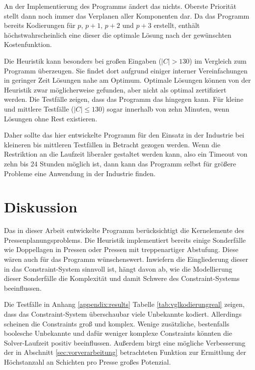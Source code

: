 An der Implementierung des Programms ändert das nichts.
Oberste Priorität stellt dann noch immer das Verplanen aller Komponenten dar.
Da das Programm bereits Kodierungen für $p$, $p+1$, $p+2$ und $p+3$ erstellt, enthält höchstwahrscheinlich eine dieser die optimale Lösung nach der gewünschten Kostenfunktion.

Die Heuristik kann besonders bei großen Eingaben ($\lvert C \rvert > 130$) im Vergleich zum Programm überzeugen.
Sie findet dort aufgrund einiger interner Vereinfachungen in geringer Zeit Lösungen nahe am Optimum.
Optimale Lösungen können von der Heuristik zwar möglicherweise gefunden, aber nicht als optimal zertifiziert werden.
Die Testfälle zeigen, dass das Programm das hingegen kann.
Für kleine und mittlere Testfälle ($\lvert C \rvert \leq 130$) sogar innerhalb von zehn Minuten, wenn Lösungen ohne Rest existieren.

Daher sollte das hier entwickelte Programm für den Einsatz in der Industrie bei kleineren bis mittleren Testfällen in Betracht gezogen werden.
Wenn die Restriktion an die Laufzeit liberaler gestaltet werden kann, also ein Timeout von zehn bis 24 Stunden möglich ist, dann kann das Programm selbst für
größere Probleme eine Anwendung in der Industrie finden.

\section{Diskussion}
Das in dieser Arbeit entwickelte Programm berücksichtigt die Kernelemente des Pressenplanungsproblems.
Die Heuristik implementiert bereits einige Sonderfälle wie Doppellagen in Pressen oder Pressen mit treppenartiger Abstufung.
Diese wären auch für das Programm wünschenswert.
Inwiefern die Eingliederung dieser in das Constraint-System sinnvoll ist, hängt davon ab,
wie die Modellierung dieser Sonderfälle die Komplexität und damit Schwere des Constraint-Systems beeinflussen.

Die Testfälle in Anhang \ref{appendix:results} Tabelle \ref{tab:vglkodierungreal} zeigen, dass das Constraint-System überschaubar viele Unbekannte kodiert.
Allerdings scheinen die Constraints groß und komplex.
Wenige zusätzliche, bestenfalls boolesche Unbekannte und dafür weniger komplexe Constraints könnten die Solver-Laufzeit positiv beeinflussen.
Außerdem birgt eine mögliche Verbesserung der in Abschnitt \ref{sec:vorverarbeitung} betrachteten Funktion zur Ermittlung der Höchstanzahl an Schichten pro Presse großes Potenzial.
